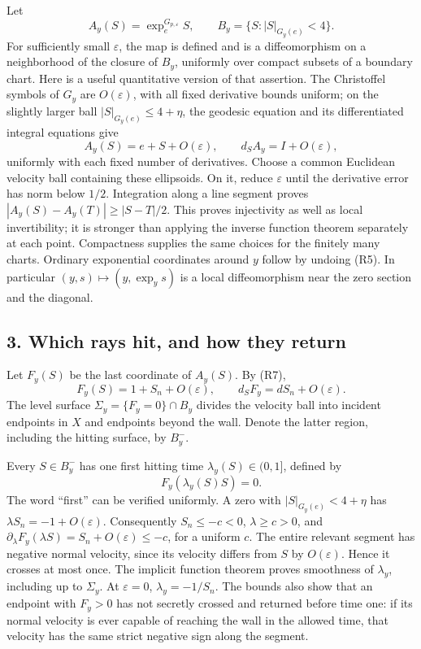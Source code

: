 \documentclass[
  11pt,
]{article}
\begin{document}
Let \[
 A_y(S)=\exp^{G_{p,\varepsilon}}_e S,\qquad
 B_y=\{S:|S|_{G_y(e)}<4\}.                                   \tag{R6}
\] For sufficiently small \(\varepsilon\), the map is defined and is a
diffeomorphism on a neighborhood of the closure of \(B_y\), uniformly
over compact subsets of a boundary chart. Here is a useful quantitative
version of that assertion. The Christoffel symbols of \(G_y\) are
\(O(\varepsilon)\), with all fixed derivative bounds uniform; on the
slightly larger ball \(|S|_{G_y(e)}\leq 4+\eta\), the geodesic equation
and its differentiated integral equations give \[
 A_y(S)=e+S+O(\varepsilon),\qquad d_SA_y=I+O(\varepsilon),
                                                               \tag{R7}
\] uniformly with each fixed number of derivatives. Choose a common
Euclidean velocity ball containing these ellipsoids. On it, reduce
\(\varepsilon\) until the derivative error has norm below \(1/2\).
Integration along a line segment proves \(|A_y(S)-A_y(T)|\geq|S-T|/2\).
This proves injectivity as well as local invertibility; it is stronger
than applying the inverse function theorem separately at each point.
Compactness supplies the same choices for the finitely many charts.
Ordinary exponential coordinates around \(y\) follow by undoing (R5). In
particular \((y,s)\mapsto(y,\exp_y s)\) is a local diffeomorphism near
the zero section and the diagonal.

\subsection{3. Which rays hit, and how they
return}\label{which-rays-hit-and-how-they-return}

Let \(F_y(S)\) be the last coordinate of \(A_y(S)\). By (R7), \[
 F_y(S)=1+S_n+O(\varepsilon),\qquad d_SF_y=dS_n+O(\varepsilon).
                                                               \tag{R8}
\] The level surface \(\Sigma_y=\{F_y=0\}\cap B_y\) divides the velocity
ball into incident endpoints in \(X\) and endpoints beyond the wall.
Denote the latter region, including the hitting surface, by \(B_y^-\).

Every \(S\in B_y^-\) has one first hitting time
\(\lambda_y(S)\in(0,1]\), defined by \[
 F_y(\lambda_y(S)S)=0.                                       \tag{R9}
\] The word ``first'' can be verified uniformly. A zero with
\(|S|_{G_y(e)}<4+\eta\) has \(\lambda S_n=-1+O(\varepsilon)\).
Consequently \(S_n\leq-c<0\), \(\lambda\geq c>0\), and
\(\partial_\lambda F_y(\lambda S)=S_n+O(\varepsilon)\leq-c\), for a
uniform \(c\). The entire relevant segment has negative normal velocity,
since its velocity differs from \(S\) by \(O(\varepsilon)\). Hence it
crosses at most once. The implicit function theorem proves smoothness of
\(\lambda_y\), including up to \(\Sigma_y\). At \(\varepsilon=0\),
\(\lambda_y=-1/S_n\). The bounds also show that an endpoint with
\(F_y>0\) has not secretly crossed and returned before time one: if its
normal velocity is ever capable of reaching the wall in the allowed
time, that velocity has the same strict negative sign along the segment.
\end{document}
